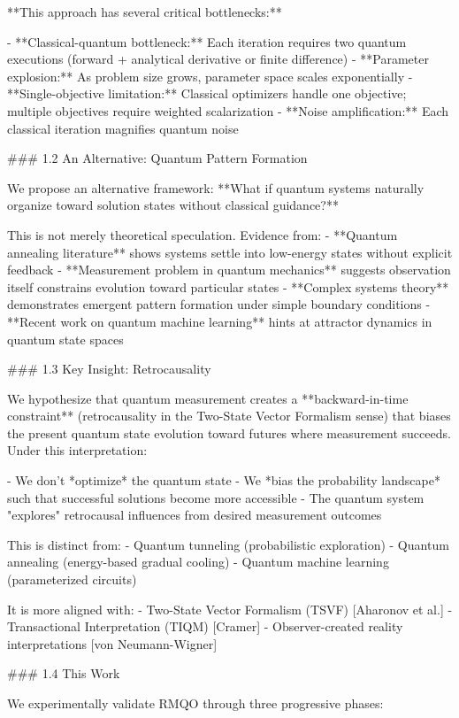 **This approach has several critical bottlenecks:**

- **Classical-quantum bottleneck:** Each iteration requires two quantum executions (forward + analytical derivative or finite difference)
- **Parameter explosion:** As problem size grows, parameter space scales exponentially
- **Single-objective limitation:** Classical optimizers handle one objective; multiple objectives require weighted scalarization
- **Noise amplification:** Each classical iteration magnifies quantum noise

### 1.2 An Alternative: Quantum Pattern Formation

We propose an alternative framework: **What if quantum systems naturally organize toward solution states without classical guidance?**

This is not merely theoretical speculation. Evidence from:
- **Quantum annealing literature** shows systems settle into low-energy states without explicit feedback
- **Measurement problem in quantum mechanics** suggests observation itself constrains evolution toward particular states
- **Complex systems theory** demonstrates emergent pattern formation under simple boundary conditions
- **Recent work on quantum machine learning** hints at attractor dynamics in quantum state spaces

### 1.3 Key Insight: Retrocausality

We hypothesize that quantum measurement creates a **backward-in-time constraint** (retrocausality in the Two-State Vector Formalism sense) that biases the present quantum state evolution toward futures where measurement succeeds. Under this interpretation:

- We don't *optimize* the quantum state
- We *bias the probability landscape* such that successful solutions become more accessible
- The quantum system "explores" retrocausal influences from desired measurement outcomes

This is distinct from:
- Quantum tunneling (probabilistic exploration)
- Quantum annealing (energy-based gradual cooling)
- Quantum machine learning (parameterized circuits)

It is more aligned with:
- Two-State Vector Formalism (TSVF) [Aharonov et al.]
- Transactional Interpretation (TIQM) [Cramer]
- Observer-created reality interpretations [von Neumann-Wigner]

### 1.4 This Work

We experimentally validate RMQO through three progressive phases:


